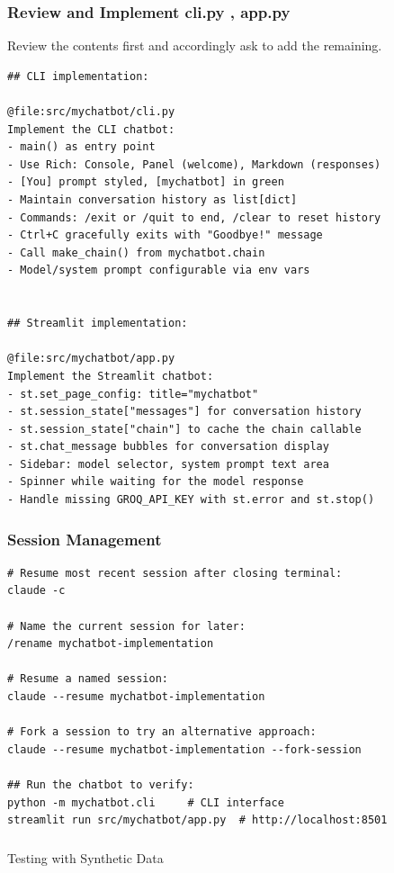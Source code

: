 \begin{frame}[fragile]\frametitle{Review and Implement cli.py ,  app.py}
Review the contents first and accordingly ask to add the remaining.


\begin{lstlisting}
## CLI implementation:

@file:src/mychatbot/cli.py
Implement the CLI chatbot:
- main() as entry point
- Use Rich: Console, Panel (welcome), Markdown (responses)
- [You] prompt styled, [mychatbot] in green
- Maintain conversation history as list[dict]
- Commands: /exit or /quit to end, /clear to reset history
- Ctrl+C gracefully exits with "Goodbye!" message
- Call make_chain() from mychatbot.chain
- Model/system prompt configurable via env vars


## Streamlit implementation:

@file:src/mychatbot/app.py
Implement the Streamlit chatbot:
- st.set_page_config: title="mychatbot"
- st.session_state["messages"] for conversation history
- st.session_state["chain"] to cache the chain callable
- st.chat_message bubbles for conversation display
- Sidebar: model selector, system prompt text area
- Spinner while waiting for the model response
- Handle missing GROQ_API_KEY with st.error and st.stop()
\end{lstlisting}
\end{frame}


\begin{frame}[fragile]\frametitle{Session Management}

\begin{lstlisting}
# Resume most recent session after closing terminal:
claude -c

# Name the current session for later:
/rename mychatbot-implementation

# Resume a named session:
claude --resume mychatbot-implementation

# Fork a session to try an alternative approach:
claude --resume mychatbot-implementation --fork-session

## Run the chatbot to verify:
python -m mychatbot.cli     # CLI interface
streamlit run src/mychatbot/app.py  # http://localhost:8501
\end{lstlisting}
\end{frame}


\begin{frame}[fragile]\frametitle{}
\begin{center}
{\Large Testing with Synthetic Data}

\end{center}
\end{frame}



